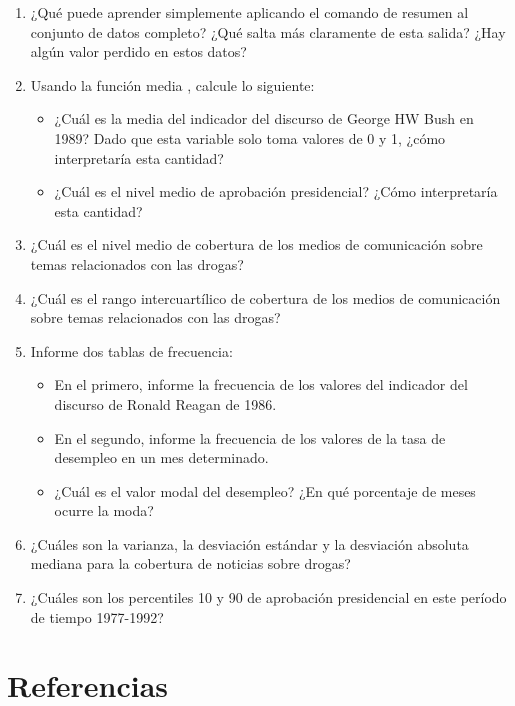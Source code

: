 \documentclass[
]{book}
\providecommand{\tightlist}{%
  \setlength{\itemsep}{0pt}\setlength{\parskip}{0pt}}
\begin{document}
\begin{enumerate}
\def\labelenumi{\arabic{enumi}.}
\item
  ¿Qué puede aprender simplemente aplicando el comando de resumen al conjunto de datos completo? ¿Qué salta más claramente de esta salida? ¿Hay algún valor perdido en estos datos?
\item
  Usando la función media , calcule lo siguiente:

  \begin{itemize}
  \tightlist
  \item
    ¿Cuál es la media del indicador del discurso de George HW Bush en 1989? Dado que esta variable solo toma valores de 0 y 1, ¿cómo interpretaría esta cantidad?
  \item
    ¿Cuál es el nivel medio de aprobación presidencial? ¿Cómo interpretaría esta cantidad?
  \end{itemize}
\item
  ¿Cuál es el nivel medio de cobertura de los medios de comunicación sobre temas relacionados con las drogas?
\item
  ¿Cuál es el rango intercuartílico de cobertura de los medios de comunicación sobre temas relacionados con las drogas?
\item
  Informe dos tablas de frecuencia:

  \begin{itemize}
  \tightlist
  \item
    En el primero, informe la frecuencia de los valores del indicador del discurso de Ronald Reagan de 1986.
  \item
    En el segundo, informe la frecuencia de los valores de la tasa de desempleo en un mes determinado.
  \item
    ¿Cuál es el valor modal del desempleo? ¿En qué porcentaje de meses ocurre la moda?
  \end{itemize}
\item
  ¿Cuáles son la varianza, la desviación estándar y la desviación absoluta mediana para la cobertura de noticias sobre drogas?
\item
  ¿Cuáles son los percentiles 10 y 90 de aprobación presidencial en este período de tiempo 1977-1992?
\end{enumerate}

\hypertarget{referencias}{%
\section*{Referencias}\label{referencias}}
\end{document}
